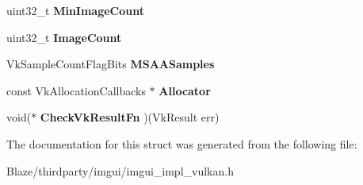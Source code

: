 \begin{DoxyCompactItemize}
uint32\+\_\+t {\bfseries Min\+Image\+Count}
\item 
\mbox{\label{structImGui__ImplVulkan__InitInfo_ad54bf1ace8ef43826a80148cfc0b336c}} 
uint32\+\_\+t {\bfseries Image\+Count}
\item 
\mbox{\label{structImGui__ImplVulkan__InitInfo_a07f4dc58914730be73d241dbe3037833}} 
Vk\+Sample\+Count\+Flag\+Bits {\bfseries M\+S\+A\+A\+Samples}
\item 
\mbox{\label{structImGui__ImplVulkan__InitInfo_a2200c0dc31e49210eea3e381f9c0a4aa}} 
const Vk\+Allocation\+Callbacks $\ast$ {\bfseries Allocator}
\item 
\mbox{\label{structImGui__ImplVulkan__InitInfo_a4e0c452744fdad8ec91ca33ba70dbceb}} 
void($\ast$ {\bfseries Check\+Vk\+Result\+Fn} )(Vk\+Result err)
\end{DoxyCompactItemize}


The documentation for this struct was generated from the following file\+:\begin{DoxyCompactItemize}
\item 
Blaze/thirdparty/imgui/imgui\+\_\+impl\+\_\+vulkan.\+h\end{DoxyCompactItemize}
